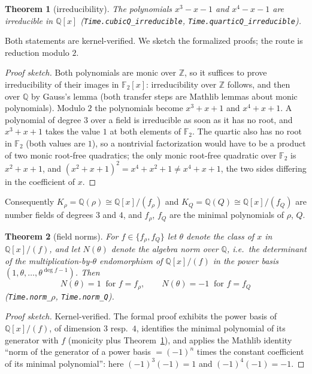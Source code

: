 \documentclass[11pt]{amsart}
\theoremstyle{plain}
\newtheorem{theorem}{Theorem}[section]
\theoremstyle{definition}
\theoremstyle{remark}
\begin{document}
\begin{theorem}[irreducibility]\label{thm:irred}
The polynomials $x^3 - x - 1$ and $x^4 - x - 1$ are irreducible in $\mathbb{Q}[x]$ \textup{(\texttt{Time.cubicQ\_irreducible}, \texttt{Time.quarticQ\_irreducible})}.
\end{theorem}

Both statements are kernel-verified. We sketch the formalized proofs; the route is reduction modulo $2$.

\begin{proof}[Proof sketch]
Both polynomials are monic over $\mathbb{Z}$, so it suffices to prove irreducibility of their images in $\mathbb{F}_2[x]$: irreducibility over $\mathbb{Z}$ follows, and then over $\mathbb{Q}$ by Gauss's lemma (both transfer steps are Mathlib lemmas about monic polynomials). Modulo $2$ the polynomials become $x^3 + x + 1$ and $x^4 + x + 1$. A polynomial of degree $3$ over a field is irreducible as soon as it has no root, and $x^3 + x + 1$ takes the value $1$ at both elements of $\mathbb{F}_2$. The quartic also has no root in $\mathbb{F}_2$ (both values are $1$), so a nontrivial factorization would have to be a product of two monic root-free quadratics; the only monic root-free quadratic over $\mathbb{F}_2$ is $x^2 + x + 1$, and $(x^2+x+1)^2 = x^4 + x^2 + 1 \ne x^4 + x + 1$, the two sides differing in the coefficient of $x$.
\end{proof}

Consequently $K_{\rho} = \mathbb{Q}(\rho) \cong \mathbb{Q}[x]/(f_{\rho})$ and $K_{Q} = \mathbb{Q}(Q) \cong \mathbb{Q}[x]/(f_{Q})$ are number fields of degrees $3$ and $4$, and $f_{\rho}$, $f_{Q}$ are the minimal polynomials of $\rho$, $Q$.

\begin{theorem}[field norms]\label{thm:norms}
For $f \in \{f_{\rho}, f_{Q}\}$ let $\theta$ denote the class of $x$ in $\mathbb{Q}[x]/(f)$, and let $N(\theta)$ denote the algebra norm over $\mathbb{Q}$, i.e.\ the determinant of the multiplication-by-$\theta$ endomorphism of $\mathbb{Q}[x]/(f)$ in the power basis $(1, \theta, \dots, \theta^{\deg f - 1})$. Then
\[
  N(\theta) = 1 \ \text{ for } f = f_{\rho},
  \qquad
  N(\theta) = -1 \ \text{ for } f = f_{Q}
\]
\textup{(\texttt{Time.norm\_$\rho$}, \texttt{Time.norm\_Q})}.
\end{theorem}

\begin{proof}[Proof sketch]
Kernel-verified. The formal proof exhibits the power basis of $\mathbb{Q}[x]/(f)$, of dimension $3$ resp.\ $4$, identifies the minimal polynomial of its generator with $f$ (monicity plus Theorem~\ref{thm:irred}), and applies the Mathlib identity ``norm of the generator of a power basis $= (-1)^{n}$ times the constant coefficient of its minimal polynomial'': here $(-1)^3(-1) = 1$ and $(-1)^4(-1) = -1$.
\end{proof}
\end{document}
